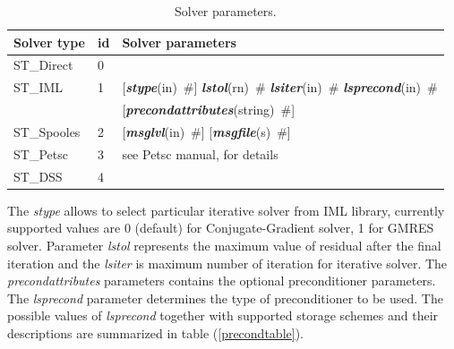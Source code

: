 \documentclass[a4paper]{article}
\newcommand{\param}[1]{{\em #1}}
\newcommand{\keywordnotype}[1]{\mbox{{\it{\bf{#1}}}}}
\newcommand{\keyword}[2]{\mbox{{\keywordnotype{#1}\tiny (#2)}}}
\newcommand{\field}[2]{\mbox{\keyword{#1}{#2}~\#}}
\newcommand{\optField}[2]{\mbox{[\field{#1}{#2}]}}
\begin{document}
\begin{table}[h]
\begin{center}
\begin{tabular}{|l|l|l|}
\hline
Solver type & id & Solver parameters \\
\hline
ST\_Direct  &0&\\
ST\_IML     &1& \optField{stype}{in} \field{lstol}{rn} \field{lsiter}{in}
\field{lsprecond}{in}\\
                  & &  \optField{precondattributes}{string}\\

ST\_Spooles &2&  \optField{msglvl}{in} \optField{msgfile}{s}\\
ST\_Petsc   &3& see Petsc manual, for details\footnotemark\\
ST\_DSS     &4& \\
\hline
\end{tabular}
\caption{Solver parameters.}
\label{sparsesolverparams}
\end{center}
\end{table}
The \param{stype} allows to select particular iterative solver from IML library, currently supported values are 0 (default) for Conjugate-Gradient solver, 1 for GMRES solver. Parameter \param{lstol} represents the maximum value of residual after the
final iteration and the \param{lsiter} is maximum number of iteration  for
iterative solver.
The \param{precondattributes} parameters contains the optional
preconditioner parameters.
The \param{lsprecond} parameter determines the type of preconditioner to be
used. The possible values of \param{lsprecond} together with supported
storage schemes and their descriptions are summarized in table
(\ref{precondtable}).
\end{document}
